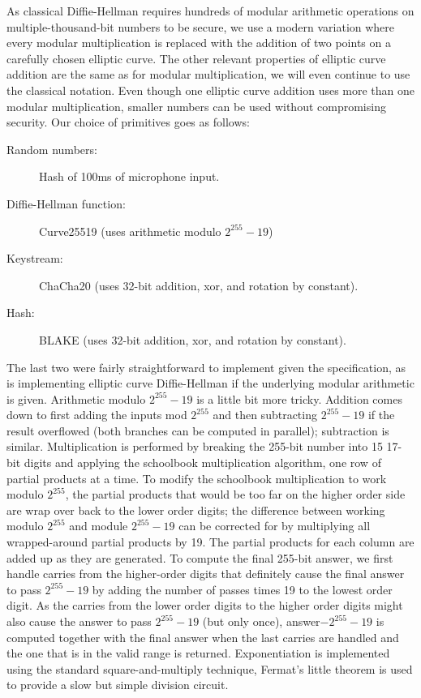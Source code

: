 \documentclass[a4paper]{report}
\begin{document}
As classical Diffie-Hellman requires hundreds of modular arithmetic operations
on multiple-thousand-bit numbers to be secure, we use a modern
variation where every modular multiplication is replaced with the addition of
two points on a carefully chosen elliptic curve. The other relevant properties
of elliptic curve addition are the same as for modular multiplication, we will %
even continue to use the classical notation. Even though one elliptic curve
addition uses more than one modular multiplication, smaller numbers can be used
without compromising security. Our choice of primitives goes as follows:

\begin{description}
  \item[Random numbers:] Hash of 100ms of microphone input.
  \item[Diffie-Hellman function:] Curve25519 (uses arithmetic modulo $2^{255}-19$)
  \item[Keystream:] ChaCha20 (uses 32-bit addition, xor, and rotation by constant).
  \item[Hash:] BLAKE (uses 32-bit addition, xor, and rotation by constant).
\end{description}

The last two were fairly straightforward to implement given the specification, as
is implementing elliptic curve Diffie-Hellman if the underlying modular
arithmetic is given. Arithmetic modulo $2^{255}-19$ is a little bit more
tricky. Addition comes down to first adding the inputs mod $2^{255}$ and then
subtracting $2^{255}-19$ if the result overflowed (both branches can be computed
in parallel); subtraction is similar.  Multiplication is performed by breaking
the 255-bit number into 15 17-bit digits and applying the schoolbook
multiplication algorithm, one row of partial products at a time. To modify the
schoolbook multiplication to work modulo $2^{255}$, the partial products that
would be too far on the higher order side are wrap over back to the lower order
digits; the difference between working modulo $2^{255}$ and module $2^{255}-19$
can be corrected for by multiplying all wrapped-around partial products by 19.
The partial products for each column are added up as they are generated. To
compute the final 255-bit answer, we first handle carries from the higher-order
digits that definitely cause the final answer to pass $2^{255}-19$ by adding the
number of passes times 19 to the lowest order digit. As the carries from the
lower order digits to the higher order digits might also cause the answer to
pass $2^{255}-19$ (but only once), answer$-2^{255}-19$ is computed together with
the final answer when the last carries are handled and the one that is in the
valid range is returned. Exponentiation is implemented using the standard
square-and-multiply technique, Fermat's little theorem is used to provide a slow
but simple division circuit.
\end{document}

